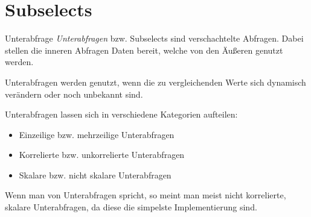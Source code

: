\section{Subselects}

\begin{defi}{Unterabfrage}
    \emph{Unterabfragen} bzw. Subselects sind verschachtelte Abfragen.
    Dabei stellen die inneren Abfragen Daten bereit, welche von den Äußeren genutzt werden.
    
    Unterabfragen werden genutzt, wenn die zu vergleichenden Werte sich dynamisch verändern oder noch unbekannt sind.

    Unterabfragen lassen sich in verschiedene Kategorien aufteilen:

    \begin{itemize}
        \item Einzeilige bzw. mehrzeilige Unterabfragen
        \item Korrelierte bzw. unkorrelierte Unterabfragen
        \item Skalare bzw. nicht skalare Unterabfragen
    \end{itemize}

    Wenn man von Unterabfragen spricht, so meint man meist nicht korrelierte, skalare Unterabfragen, da diese die simpelste Implementierung sind.
\end{defi}

